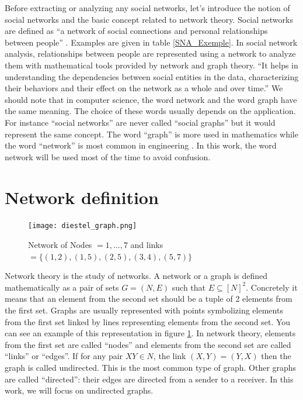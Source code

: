 \documentclass[a4paper, 12pt]{report}
\begin{document}
Before extracting or analyzing any social networks, let's introduce the notion of social networks and the basic concept related to network theory.
Social networks are defined as ``a network of social connections and personal relationships between people'' \citep{SNA_Overview}. Examples are given in table \ref{SNA_Exemple}.
In social network analysis, relationships between people are represented using a network to analyze them with mathematical tools provided by network
and graph theory. ``It helps in understanding the
dependencies between social entities in the data, characterizing
their behaviors and their effect on the network as
a whole and over time.'' \citep{SNA_Overview}
We should note that in computer science, the word network and the word graph have the same meaning. The choice of these words usually depends on the application. For instance ``social networks'' are never called ``social graphs''
but it would represent the same concept. The word ``graph'' is more used in mathematics while the word ``network'' is most common in engineering \citep{network_theory}. In this work, the word network will be used most of the time to avoid confusion.


\section{Network definition}
\begin{figure}
\centering
\texttt{[image: diestel\_graph.png]}
\caption{Network of Nodes $= 1,...,7$ and links $= \{(1, 2), (1, 5), (2, 5), (3, 4), (5, 7)\}$ \citep{diestel}}
\label{diestel_graph}
\end{figure}

Network theory is the study of networks. A network or a graph is defined mathematically as a pair of sets $G = (N, E)$ such that $E \subseteq [N ]^2$. Concretely it means that an element from the second set should be a tuple of 2 elements from the first set.
Graphs are usually represented with points symbolizing elements from the first set linked by lines representing elements from the second set. You can see an example of this representation in figure \ref{diestel_graph}. In network theory, elements from the first set are called ``nodes'' and elements from the second set are called ``links'' or ``edges''. If for any pair $XY \in N$, the link $(X,Y) = (Y,X)$ then the graph is called undirected. This is the most common type of graph. Other graphs are called ``directed'': their edges are directed from a sender to a receiver. In this work, we will focus on undirected graphs. \citep{diestel}\\
\end{document}
